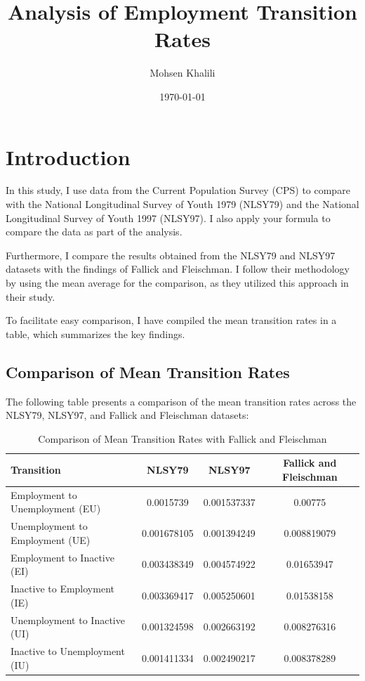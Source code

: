 \documentclass{article}  %
\title{Analysis of Employment Transition Rates}
\author{Mohsen Khalili}
\date{\today}
\begin{document}
	\maketitle
	\tableofcontents
	\newpage
	\section{Introduction}
	
	In this study, I use data from the Current Population Survey (CPS) to compare with the National Longitudinal Survey of Youth 1979 (NLSY79) and the National Longitudinal Survey of Youth 1997 (NLSY97). I also apply your formula to compare the data as part of the analysis.
	
	Furthermore, I compare the results obtained from the NLSY79 and NLSY97 datasets with the findings of Fallick and Fleischman. I follow their methodology by using the mean average for the comparison, as they utilized this approach in their study.
	
	To facilitate easy comparison, I have compiled the mean transition rates in a table, which summarizes the key findings.
	\subsection{Comparison of Mean Transition Rates}
	
	The following table presents a comparison of the mean transition rates across the NLSY79, NLSY97, and Fallick and Fleischman datasets:
	
	\newpage
	\begin{table}[H]
		\centering
		\caption{Comparison of Mean Transition Rates with Fallick and Fleischman }
		\label{tab:mean_transition_comparison}
		\begin{tabular}{|l|c|c|c|}
			\hline
			\textbf{Transition}                      & \textbf{NLSY79} & \textbf{NLSY97} & \textbf{Fallick and Fleischman} \\ \hline
			Employment to Unemployment (EU)          & 0.0015739       & 0.001537337     & 0.00775                         \\ \hline
			Unemployment to Employment (UE)          & 0.001678105     & 0.001394249     & 0.008819079                     \\ \hline
			Employment to Inactive (EI)              & 0.003438349     & 0.004574922     & 0.01653947                      \\ \hline
			Inactive to Employment (IE)              & 0.003369417     & 0.005250601     & 0.01538158                      \\ \hline
			Unemployment to Inactive (UI)            & 0.001324598     & 0.002663192     & 0.008276316                     \\ \hline
			Inactive to Unemployment (IU)            & 0.001411334     & 0.002490217     & 0.008378289                     \\ \hline
		\end{tabular}
	\end{table}
	
\end{document}
